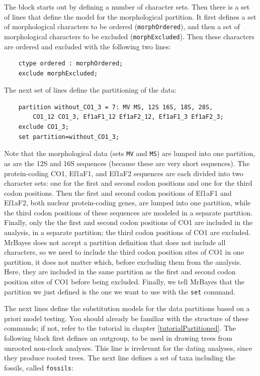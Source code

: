 \documentclass[12pt]{book}
\newcommand{\ttt}[1]{\texttt{#1}}
\begin{document}
The block starts out by defining a number of character sets. Then there is a set of lines that
define the model for the morphological partition. It first defines a set of morphological
characters to be ordered (\ttt{morphOrdered}), and then a set of morphological characters to be
excluded (\ttt{morphExcluded}). Then these characters are ordered and excluded with the
following two lines:

\begin{singlespacing}
\begin{verbatim}
    ctype ordered : morphOrdered;
    exclude morphExcluded;
\end{verbatim}
\end{singlespacing}

The next set of lines define the partitioning of the data:

\begin{singlespacing}
\begin{verbatim}
    partition without_CO1_3 = 7: MV MS, 12S 16S, 18S, 28S,
        CO1_12 CO1_3, Ef1aF1_12 Ef1aF2_12, Ef1aF1_3 Ef1aF2_3;
    exclude CO1_3;
    set partition=without_CO1_3;
\end{verbatim}
\end{singlespacing}

Note that the morphological data (sets \ttt{MV} and \ttt{MS}) are lumped into one partition, as are
the 12S and 16S sequences (because these are very short sequences). The protein-coding CO1, Ef1aF1,
and Ef1aF2 sequences are each divided into two character sets: one for the first and second codon
positions and one for the third codon positions. Then the first and second codon positions of
Ef1aF1 and Ef1aF2, both nuclear protein-coding genes, are lumped into one partition, while the
third codon positions of these sequences are modeled in a separate partition. Finally, only the the
first and second codon positions of CO1 are included in the analysis, in a separate partition; the
third codon positions of CO1 are excluded. MrBayes does not accept a partition definition that does
not include all characters, so we need to include the third codon position sites of CO1 in one
partition, it does not matter which, before excluding them from the analysis. Here, they are
included in the same partition as the first and second codon position sites of CO1 before being
excluded. Finally, we tell MrBayes that the partition we just defined is the one we want to use
with the \ttt{set} command.

The next lines define the substitution models for the data partitions based on a priori model
testing. You should already be familiar with the structure of these commands; if not, refer to the
tutorial in chapter \ref{tutorialPartitioned}. The following block first defines an outgroup, to
be used in drawing trees from unrooted non-clock analyses. This line is irrelevant for the dating
analyses, since they produce rooted trees. The next line defines a set of taxa including the
fossils, called \ttt{fossils}:
\end{document}
